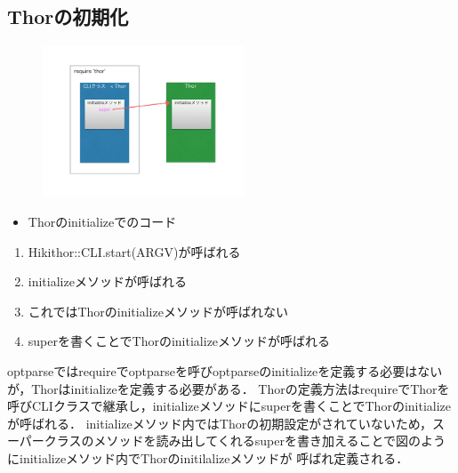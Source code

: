 
\subsection{Thorの初期化}
\begin{figure}[htbp]\begin{center}
\includegraphics[width=6cm,bb=0 0 442 500]{../figs/./hikiutils_yamane_09_copy.003.jpg}
\caption{}
\label{default}\end{center}\end{figure}\begin{itemize}
\item Thorのinitializeでのコード
\end{itemize}\begin{enumerate}
\item Hikithor::CLI.start(ARGV)が呼ばれる
\item initializeメソッドが呼ばれる
\item これではThorのinitializeメソッドが呼ばれない
\item superを書くことでThorのinitializeメソッドが呼ばれる
\end{enumerate}
optparseではrequireでoptparseを呼びoptparseのinitializeを定義する必要はないが，Thorはinitializeを定義する必要がある．
Thorの定義方法はrequireでThorを呼びCLIクラスで継承し，initializeメソッドにsuperを書くことでThorのinitializeが呼ばれる．
initializeメソッド内ではThorの初期設定がされていないため，スーパークラスのメソッドを読み出してくれるsuperを書き加えることで図のようにinitializeメソッド内でThorのinitilalizeメソッドが
呼ばれ定義される．

